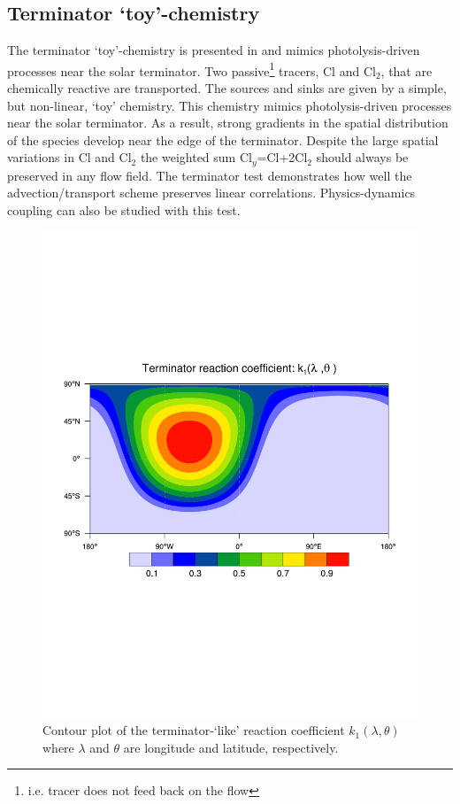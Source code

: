 \documentclass[times,doublespace]{fldauth}
\begin{document}
\subsection{Terminator `toy'-chemistry}
The terminator `toy'-chemistry is presented in \cite{LCLVT2015GMD} and mimics photolysis-driven processes near the solar terminator. Two passive{\footnote{i.e. tracer does not feed back on the flow}} tracers, Cl and Cl$_2$, that are chemically reactive are transported. The sources and sinks are given by a simple, but non-linear, `toy' chemistry. This chemistry mimics photolysis-driven processes near the solar terminator.  As a result, strong gradients in the spatial distribution of the species develop near the edge of the terminator. Despite the large spatial variations in Cl and Cl$_2$ the weighted sum Cl$_y$=Cl+2Cl$_2$ should always be preserved in any flow field.  The terminator test demonstrates how well the advection/transport scheme preserves linear correlations. Physics-dynamics coupling can also be studied with this test.
\begin{figure}[t]
\includegraphics[width=\linewidth]{terminator_reaction_rates.pdf}
\caption{Contour plot of the terminator-`like' reaction coefficient $k_1(\lambda,\theta)$ where $\lambda$ and $\theta$ are longitude and latitude, respectively.}
\label{fig:k1}
\end{figure}
\end{document}
